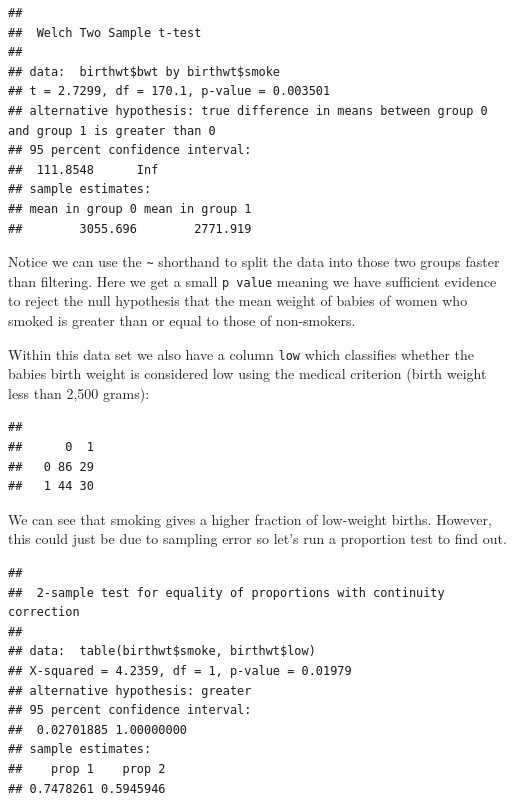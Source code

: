 \documentclass[
]{book}
\newenvironment{Shaded}{\begin{snugshade}}{\end{snugshade}}
\newcommand{\AttributeTok}[1]{\textcolor[rgb]{0.77,0.63,0.00}{#1}}
\newcommand{\DocumentationTok}[1]{\textcolor[rgb]{0.56,0.35,0.01}{\textbf{\textit{#1}}}}
\newcommand{\FunctionTok}[1]{\textcolor[rgb]{0.00,0.00,0.00}{#1}}
\newcommand{\NormalTok}[1]{#1}
\newcommand{\SpecialCharTok}[1]{\textcolor[rgb]{0.00,0.00,0.00}{#1}}
\newcommand{\StringTok}[1]{\textcolor[rgb]{0.31,0.60,0.02}{#1}}
\theoremstyle{definition}
\theoremstyle{definition}
\theoremstyle{definition}
\theoremstyle{definition}
\theoremstyle{remark}
\begin{document}
\begin{verbatim}
## 
##  Welch Two Sample t-test
## 
## data:  birthwt$bwt by birthwt$smoke
## t = 2.7299, df = 170.1, p-value = 0.003501
## alternative hypothesis: true difference in means between group 0 and group 1 is greater than 0
## 95 percent confidence interval:
##  111.8548      Inf
## sample estimates:
## mean in group 0 mean in group 1 
##        3055.696        2771.919
\end{verbatim}

Notice we can use the \texttt{\textasciitilde{}} shorthand to split the data into those two groups faster than filtering. Here we get a small \texttt{p\ value} meaning we have sufficient evidence to reject the null hypothesis that the mean weight of babies of women who smoked is greater than or equal to those of non-smokers.

Within this data set we also have a column \texttt{low} which classifies whether the babies birth weight is considered low using the medical criterion (birth weight less than 2,500 grams):

\begin{Shaded}
\end{Shaded}

\begin{verbatim}
##    
##      0  1
##   0 86 29
##   1 44 30
\end{verbatim}

We can see that smoking gives a higher fraction of low-weight births. However, this could just be due to sampling error so let's run a proportion test to find out.

\begin{Shaded}
\end{Shaded}

\begin{verbatim}
## 
##  2-sample test for equality of proportions with continuity correction
## 
## data:  table(birthwt$smoke, birthwt$low)
## X-squared = 4.2359, df = 1, p-value = 0.01979
## alternative hypothesis: greater
## 95 percent confidence interval:
##  0.02701885 1.00000000
## sample estimates:
##    prop 1    prop 2 
## 0.7478261 0.5945946
\end{verbatim}
\end{document}
